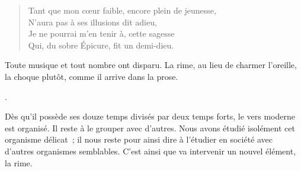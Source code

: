 \documentclass[french,twoside]{book} %
\begin{document}
{\begin{verse}
Tant que mon cœur faible, encore plein de jeunesse,\\
N’aura pas à ses illusions dit adieu,\\
Je ne pourrai m’en tenir à, cette sagesse\\
Qui, du sobre Épicure, fit un demi-dieu.\\
\end{verse}
\par
\noindent Toute musique et tout nombre ont disparu. La rime, au lieu de charmer l’oreille, la choque plutôt, comme il arrive dans la prose.
}.\par
Dès qu’il possède ses douze temps divisés par deux temps forts, le vers moderne est organisé. Il reste à le grouper avec d’autres. Nous avons étudié isolément cet organisme délicat ; il nous reste pour ainsi dire à l’étudier en société avec d’autres organismes semblables. C’est ainsi que va intervenir un nouvel élément, la rime.\par
\end{document}
